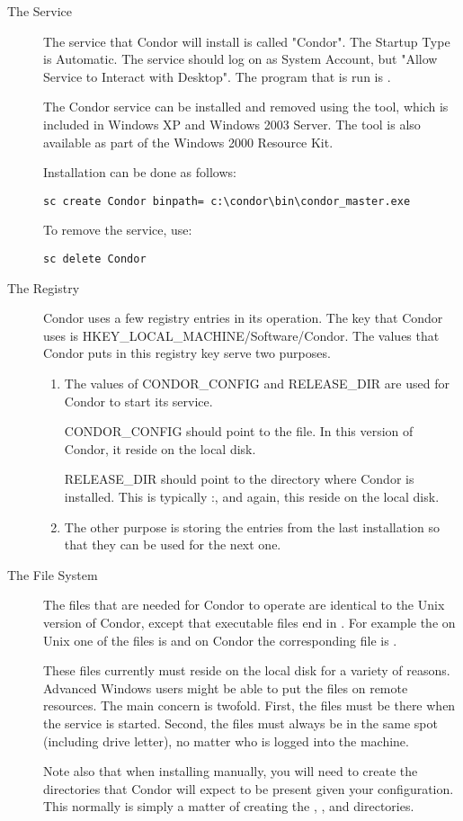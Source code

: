 \begin{description}
\item [The Service]
The service that Condor will install is called "Condor".  The Startup
Type is Automatic.  The service should log on as System Account, but
 "Allow Service to Interact with Desktop".  The
program that is run is .

The Condor service can be installed and removed using the
 tool, which is included in Windows XP and Windows 2003
Server. The tool is also available as part of the Windows 2000
Resource Kit.

Installation can be done as follows:
\begin{verbatim}
sc create Condor binpath= c:\condor\bin\condor_master.exe
\end{verbatim}

To remove the service, use:
\begin{verbatim}
sc delete Condor
\end{verbatim}

\item [The Registry]
Condor uses a few registry entries in its operation.  The key that Condor
uses is HKEY\_LOCAL\_MACHINE/Software/Condor.  The values that Condor puts
in this registry key serve two purposes.
\begin{enumerate}
\item The values of CONDOR\_CONFIG and RELEASE\_DIR are used for Condor
to start its service.

CONDOR\_CONFIG should point to the  file.  In this version
of Condor, it  reside on the local disk.

RELEASE\_DIR should point to the directory where Condor is installed.  This
is typically
\verb@C:\Condor@, and again, this  reside on the
local disk.

\item The other purpose is storing the entries from the last installation
so that they can be used for the next one.
\end{enumerate}

\item [The File System]
The files that are needed for Condor to operate are identical to the Unix
version of Condor, except that executable files end in .  For
example the on Unix one of the files is  and on Condor
the corresponding file is .

These files currently must reside on the local disk for a variety of reasons.
Advanced Windows users might be able to put the files on remote resources.
The main concern is twofold.  First, the files must be there when the service
is started.  Second, the files must always be in the same spot (including
drive letter), no matter who is logged into the machine.  

Note also that when installing manually, you will need to create the
directories that Condor will expect to be present given your
configuration. This normally is simply a matter of creating the
, , and  directories.

\end{description}


